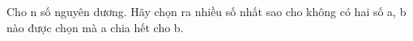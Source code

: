 Cho n số nguyên dương. Hãy chọn ra nhiều số nhất sao cho không có hai số a, b nào được chọn mà a chia hết cho b.
